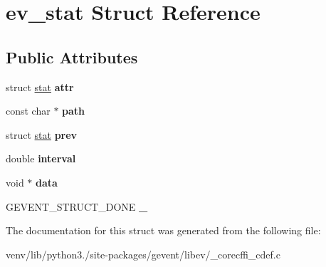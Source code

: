 \hypertarget{structev__stat}{}\section{ev\+\_\+stat Struct Reference}
\label{structev__stat}
\subsection*{Public Attributes}
\begin{DoxyCompactItemize}
\item 
\mbox{\label{structev__stat_ae28d712686bb584d292fbd9bf22816da}} 
struct \hyperlink{structstat}{stat} {\bfseries attr}
\item 
\mbox{\label{structev__stat_a90d741ec1bba36e053b47d187b8d377e}} 
const char $\ast$ {\bfseries path}
\item 
\mbox{\label{structev__stat_af8f170bba74c01e0f8d96bf515066a99}} 
struct \hyperlink{structstat}{stat} {\bfseries prev}
\item 
\mbox{\label{structev__stat_abf722a96fab0c2256f72bb327a8f3666}} 
double {\bfseries interval}
\item 
\mbox{\label{structev__stat_af379fd5c681bb7ea9b51f66b2de63c3e}} 
void $\ast$ {\bfseries data}
\item 
\mbox{\label{structev__stat_ac58155ecc59e00b5e1a1172d27c7d93b}} 
G\+E\+V\+E\+N\+T\+\_\+\+S\+T\+R\+U\+C\+T\+\_\+\+D\+O\+NE {\bfseries \+\_\+}
\end{DoxyCompactItemize}


The documentation for this struct was generated from the following file\+:\begin{DoxyCompactItemize}
\item 
venv/lib/python3./site-\/packages/gevent/libev/\+\_\+corecffi\+\_\+cdef.\+c\end{DoxyCompactItemize}
